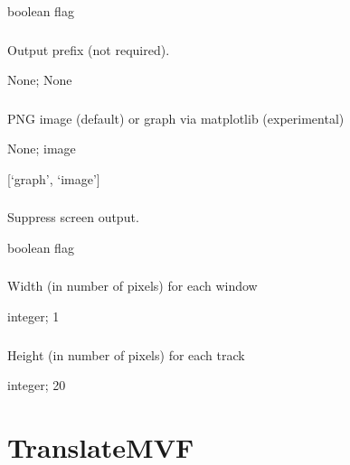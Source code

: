 \documentclass[letterpaper,11pt,english]{sphinxmanual}
\begin{document}
 boolean flag


\subsubsection{}
\label{\detokenize{prog_desc:out-prefix-outprefix}}
 Output prefix (not required).

 None;  None


\subsubsection{}
\label{\detokenize{prog_desc:plot-type-plottype}}
 PNG image (default) or graph via matplotlib (experimental)

 None;  image

 {[}‘graph’, ‘image’{]}


\subsubsection{}
\label{\detokenize{prog_desc:id128}}
 Suppress screen output.

 boolean flag


\subsubsection{}
\label{\detokenize{prog_desc:xscale}}
 Width (in number of pixels) for each window

 integer;  1


\subsubsection{}
\label{\detokenize{prog_desc:yscale}}
 Height (in number of pixels) for each track

 integer;  20


\section{TranslateMVF}
\label{\detokenize{prog_desc:translatemvf}}
\end{document}
